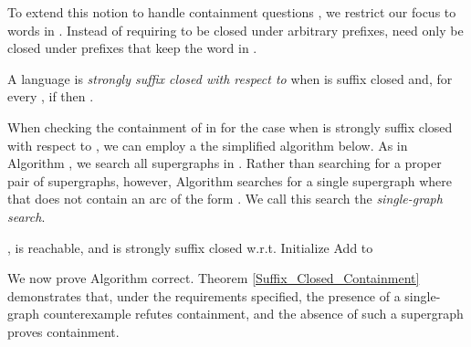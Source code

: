 \documentclass{LMCS}
\newcommand\buchi{B\"uchi }
\begin{document}
To extend this notion to handle containment questions , we
restrict our focus to words in . Instead of requiring  to be closed
under arbitrary prefixes,  need only be closed under prefixes that keep the
word in .

\begin{defi}
A language  is \emph{strongly suffix closed with respect to } when
 is suffix closed and, for every , if
 then .
\end{defi}

When checking the containment of  in  for the case when  is
strongly suffix closed with respect to , we can employ a the simplified
algorithm below. As in Algorithm \linebreak[4]\DGS, we search all supergraphs in
. Rather than searching for a proper pair of supergraphs,
however, Algorithm \SGS searches for a single supergraph  where
 that does not contain an arc of the form
. We call this search the
\emph{single-graph search}.

\begin{algorithm}[htp]
\caption{}
\label{Alg:SingleGraphSearch}
\DontPrintSemicolon
\KwData{Two \buchi automata,  and .}
\emph{} ,  is reachable, and  is strongly suffix closed w.r.t. \;
  Initialize \;
  {
  {
	  \;
    Add  to \;
    {
       {
       }
    }
  }
  }
\end{algorithm}

We now prove Algorithm \SGS correct. Theorem \ref{Suffix_Closed_Containment}
demonstrates that, under the requirements specified, the presence of a
single-graph counterexample refutes containment, and the absence of such a
supergraph proves containment.  
\end{document}
